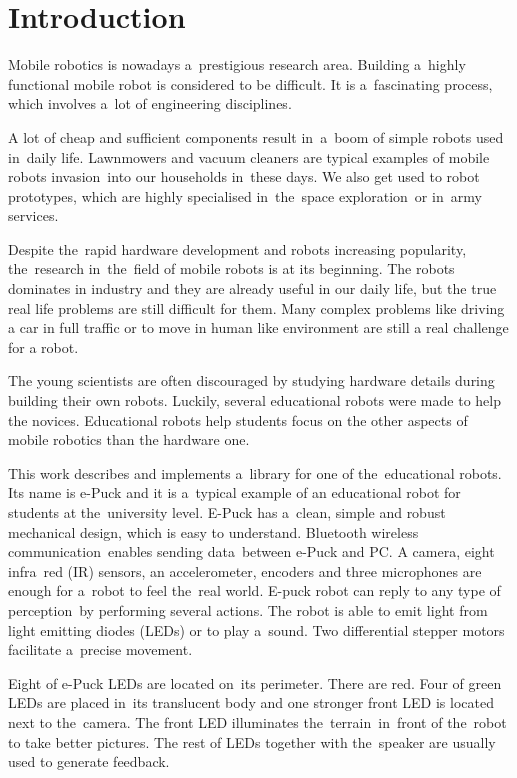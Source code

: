 \chapter{Introduction}
\label{chap:intro}
  Mobile robotics is nowadays a~prestigious research area. Building a~highly functional 
  mobile robot is considered to be difficult. 
  It is a~fascinating process, which
  involves a~lot of engineering disciplines.
  
  A lot of cheap and sufficient components result in~a~boom of simple robots used in~daily life. 
  Lawnmowers and vacuum cleaners are typical examples of mobile robots invasion~into our households in~these days.
  We also get used to robot prototypes, which are highly specialised in~the~space exploration~or in~army services.

  Despite the~rapid hardware development and robots increasing popularity,
  the~research in~the~field of mobile robots is at its beginning.
  The robots dominates in industry and they are already useful in our daily
  life, but the true real life problems are still difficult for them.
  Many complex problems like driving a car in full traffic or to move in human
  like environment are still a real challenge for a robot.
   
  The young scientists are often discouraged by
  studying hardware details during building their own robots.
  Luckily, several educational robots were made to help the novices.
  Educational robots help students focus on the other aspects of mobile robotics than the hardware one.
 
  This work describes and implements a~library for one of the~educational robots.
  Its name is e-Puck and it is a~typical example of an educational robot for students at the~university level. 
  E-Puck has a~clean, simple and robust mechanical design, which is easy to understand.
  Bluetooth wireless communication~enables sending data~between e-Puck and PC.
  A camera, eight infra~red (IR) sensors,	an accelerometer, encoders and three microphones 
  are enough for a~robot to feel the~real world.
  E-puck robot can reply to any type of perception~by performing several actions. 
  The robot is able to emit light from light emitting diodes (LEDs) or to play a~sound.
  Two differential stepper motors facilitate a~precise movement. 
  
  Eight of e-Puck LEDs are located on~its perimeter. There are red. 
  Four of green LEDs are placed in~its translucent body and
  one stronger front LED is located next to the~camera. 
  The front LED illuminates the~terrain~in~front of the~robot to
  take better pictures. The rest of LEDs together with the~speaker are usually used to
  generate feedback. 
  
